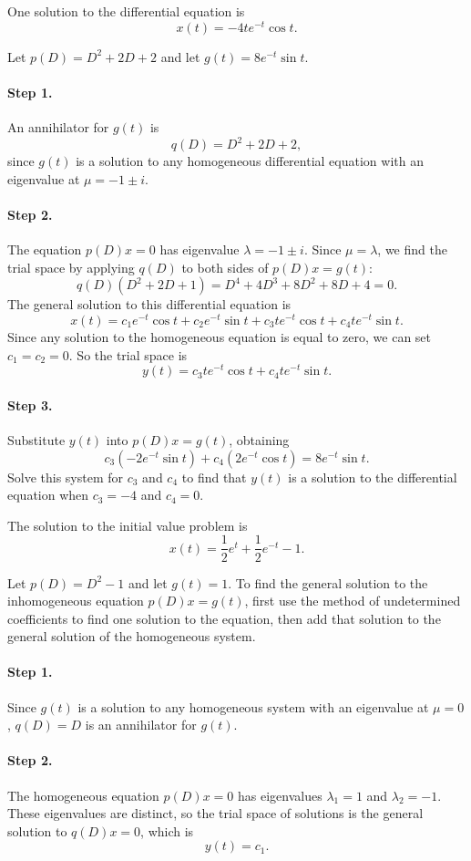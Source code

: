  \ans One solution to the differential equation is
\[
x(t) = -4te^{-t}\cos t.
\]

\soln Let $p(D) = D^2 + 2D + 2$ and let $g(t) = 8e^{-t}\sin t$.
\paragraph{Step 1.} An annihilator for $g(t)$ is
\[
q(D) = D^2 + 2D + 2,
\]
since $g(t)$ is a solution to any homogeneous differential equation
with an eigenvalue at $\mu = -1 \pm i$.

\paragraph{Step 2.} The equation $p(D)x = 0$ has eigenvalue
$\lambda = -1 \pm i$.  Since $\mu = \lambda$, we find the trial space
by applying $q(D)$ to both sides of $p(D)x = g(t)$:
\[
q(D)(D^2 + 2D + 1) = D^4 + 4D^3 + 8D^2 + 8D + 4	= 0.
\]
The general solution to this differential equation is
\[
x(t) = c_1e^{-t}\cos t + c_2e^{-t}\sin t + c_3te^{-t}\cos t +
c_4te^{-t}\sin t.
\]
Since any solution to the homogeneous equation is equal to zero, we can
set $c_1 = c_2 = 0$.  So the trial space is
\[
y(t) = c_3te^{-t}\cos t + c_4te^{-t}\sin t.
\]
\paragraph{Step 3.} Substitute $y(t)$ into $p(D)x = g(t)$, obtaining
\[
c_3(-2e^{-t}\sin t) + c_4(2e^{-t}\cos t) = 8e^{-t}\sin t.
\]
Solve this system for $c_3$ and $c_4$ to find that $y(t)$ is a solution
to the differential equation when $c_3 = -4$ and $c_4 = 0$.

 \ans The solution to the initial value problem is
\[
x(t) = \frac{1}{2}e^t + \frac{1}{2}e^{-t} - 1.
\]

\soln Let $p(D) = D^2 - 1$ and let $g(t) = 1$.  To find the general solution
to the inhomogeneous equation $p(D)x = g(t)$, first use the method of
undetermined coefficients to find one solution to the equation, then
add that solution to the general solution of the homogeneous system.

\paragraph{Step 1.} Since $g(t)$ is a solution to any homogeneous system
with an eigenvalue at $\mu = 0$, $q(D) = D$ is an annihilator for
$g(t)$.

\paragraph{Step 2.} The homogeneous equation $p(D)x = 0$ has eigenvalues
$\lambda_1 = 1$ and $\lambda_2 = -1$.  These eigenvalues are distinct,
so the trial space of solutions is the general solution to $q(D)x =
0$, which is
\[
y(t) = c_1.
\]
